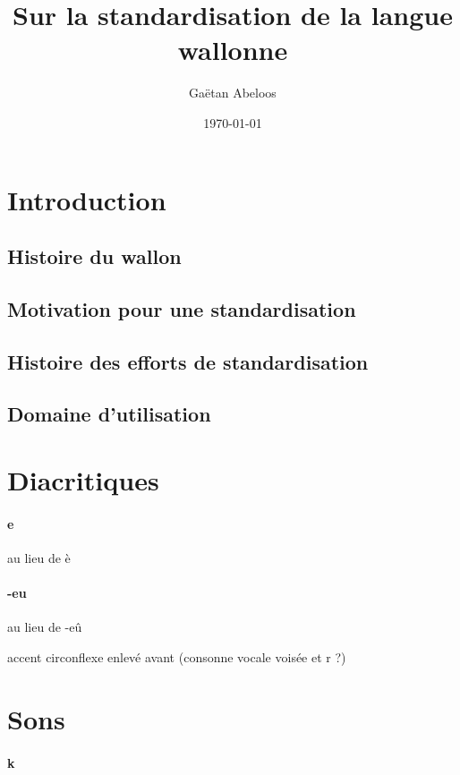 \documentclass[french]{article}
\begin{document}
\title{Sur la standardisation de la langue wallonne}
\author{Gaëtan Abeloos}
\date{\today}

\maketitle

\section{Introduction}

\subsection{Histoire du wallon}

\subsection{Motivation pour une standardisation}

\subsection{Histoire des efforts de standardisation}

\subsection{Domaine d'utilisation}

\section{Diacritiques}

\paragraph{e} au lieu de è
\paragraph{-eu} au lieu de -eû

accent circonflexe enlevé avant (consonne vocale voisée et r ?)

\section{Sons}

\paragraph{k}
\end{document}

